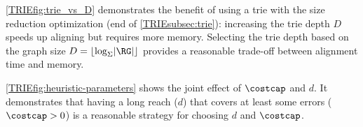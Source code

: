 \cref{TRIEfig:trie_vs_D} demonstrates the benefit of using a trie with the size
reduction optimization (end of \cref{TRIEsubsec:trie}): increasing the trie depth
$D$ speeds up aligning but requires more memory. Selecting the trie depth based
on the graph size \mbox{$D = \lfloor \log_\Sigma \lvert \RG \rvert \rfloor$}
provides a reasonable trade-off between alignment time and memory.

\cref{TRIEfig:heuristic-parameters} shows the joint effect of $\costcap$ and $d$. It
demonstrates that having a long reach ($d$) that covers at least some errors
($\costcap > 0$) is a reasonable strategy for choosing $d$ and $\costcap$.